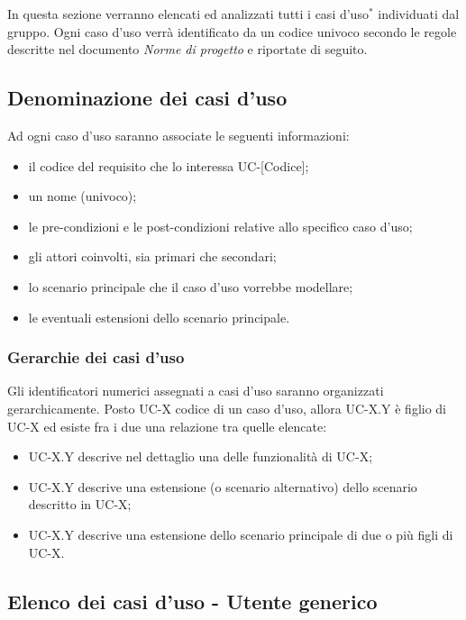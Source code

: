 In questa sezione verranno elencati ed analizzati tutti i casi d'uso$^*$ individuati dal gruppo. Ogni caso d'uso verrà identificato da un codice univoco secondo le regole descritte nel documento \textit{Norme di progetto} e riportate di seguito. 

\subsection{Denominazione dei casi d'uso}
Ad ogni caso d'uso saranno associate le seguenti informazioni:
\begin{itemize}
\item il codice del requisito che lo interessa UC-[Codice];
\item un nome (univoco);
\item le pre-condizioni e le post-condizioni relative allo specifico caso d'uso;
\item gli attori coinvolti, sia primari che secondari;
\item lo scenario principale che il caso d'uso vorrebbe modellare;
\item le eventuali estensioni dello scenario principale.
\end{itemize}

\subsubsection{Gerarchie dei casi d'uso} 
Gli identificatori numerici assegnati a casi d'uso saranno organizzati gerarchicamente. Posto UC-X codice di un caso d'uso, allora UC-X.Y è figlio di UC-X ed esiste fra i due una relazione tra quelle elencate:
\begin{itemize}
\item UC-X.Y descrive nel dettaglio una delle funzionalità di UC-X;
\item UC-X.Y descrive una estensione (o scenario alternativo) dello scenario descritto in UC-X; 
\item UC-X.Y descrive una estensione dello scenario principale di due o più figli di UC-X.
\end{itemize}

\subsection{Elenco dei casi d'uso - Utente generico}

